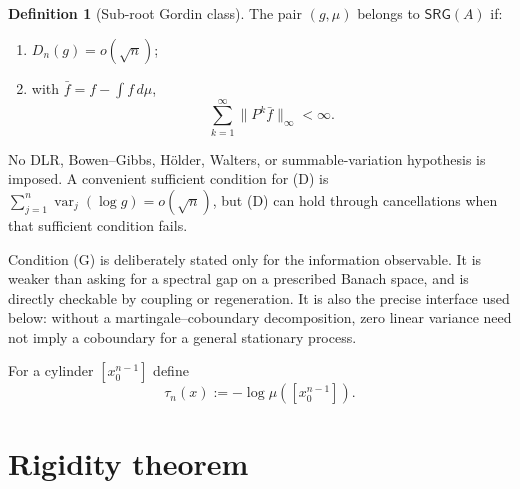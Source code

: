 \documentclass[11pt]{article}
\theoremstyle{definition}
\newtheorem{definition}[theorem]{Definition}
\theoremstyle{remark}
\begin{document}
\begin{definition}[Sub-root Gordin class]\label{def:class}
The pair $(g,\mu)$ belongs to $\mathsf{SRG}(A)$ if:
\begin{enumerate}
\item[(D)] $D_n(g)=o(\sqrt n)$;
\item[(G)] with $\bar f=f-\int f\,d\mu$,
\begin{equation}\label{eq:gordin}
 \sum_{k=1}^{\infty}\|P^k\bar f\|_\infty<\infty.
\end{equation}
\end{enumerate}
No DLR, Bowen--Gibbs, H\"older, Walters, or summable-variation hypothesis
is imposed.  A convenient sufficient condition for (D) is
$\sum_{j=1}^n\operatorname{var}_j(\log g)=o(\sqrt n)$, but (D) can hold
through cancellations when that sufficient condition fails.
\end{definition}

Condition (G) is deliberately stated only for the information observable.
It is weaker than asking for a spectral gap on a prescribed Banach space,
and is directly checkable by coupling or regeneration.  It is also the
precise interface used below: without a martingale--coboundary
decomposition, zero linear variance need not imply a coboundary for a
general stationary process.

For a cylinder $[x_0^{n-1}]$ define
\[
 \tau_n(x):=-\log\mu([x_0^{n-1}]).
\]

\section{Rigidity theorem}
\end{document}
